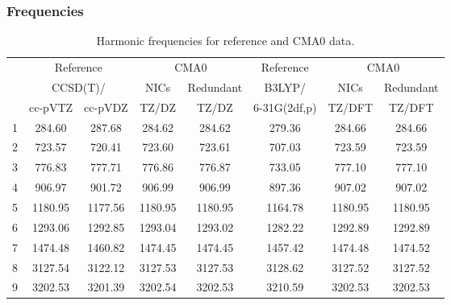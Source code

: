 \documentclass[10pt,oneside]{article}
\begin{document}
\begin{table}[h!]
\subsubsection*{Frequencies}
\centering
\caption{Harmonic frequencies for reference and CMA0 data.}
\begin{tabular}{cccccccc}
\toprule
{} & \multicolumn{2}{c}{Reference} & \multicolumn{2}{c}{CMA0} &    Reference & \multicolumn{2}{c}{CMA0} \\
{} & \multicolumn{2}{c}{CCSD(T)/} &    NICs &  Redundant &       B3LYP/ &    NICs & Redundant \\
{} &   cc-pVTZ & cc-pVDZ &   TZ/DZ &      TZ/DZ & 6-31G(2df,p) &  TZ/DFT &    TZ/DFT \\
\midrule
1 &    284.60 &  287.68 &  284.62 &     284.62 &       279.36 &  284.66 &    284.66 \\
2 &    723.57 &  720.41 &  723.60 &     723.61 &       707.03 &  723.59 &    723.59 \\
3 &    776.83 &  777.71 &  776.86 &     776.87 &       733.05 &  777.10 &    777.10 \\
4 &    906.97 &  901.72 &  906.99 &     906.99 &       897.36 &  907.02 &    907.02 \\
5 &   1180.95 & 1177.56 & 1180.95 &    1180.95 &      1164.78 & 1180.95 &   1180.95 \\
6 &   1293.06 & 1292.85 & 1293.04 &    1293.02 &      1282.22 & 1292.89 &   1292.89 \\
7 &   1474.48 & 1460.82 & 1474.45 &    1474.45 &      1457.42 & 1474.48 &   1474.52 \\
8 &   3127.54 & 3122.12 & 3127.53 &    3127.53 &      3128.62 & 3127.52 &   3127.52 \\
9 &   3202.53 & 3201.39 & 3202.54 &    3202.53 &      3210.59 & 3202.53 &   3202.53 \\
\bottomrule
\end{tabular}
\end{table}
\end{document}
